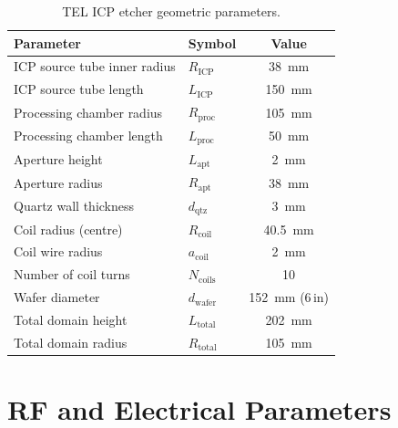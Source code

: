 \documentclass[11pt,a4paper]{report}
\begin{document}
\begin{table}[H]
\centering
\caption{TEL ICP etcher geometric parameters.}
\label{tab:app-geometry}
\begin{tabular}{@{}llc@{}}
\toprule
\textbf{Parameter} & \textbf{Symbol} & \textbf{Value} \\
\midrule
ICP source tube inner radius     & $R_\mathrm{ICP}$    & \SI{38}{\milli\meter} \\
ICP source tube length           & $L_\mathrm{ICP}$    & \SI{150}{\milli\meter} \\
Processing chamber radius        & $R_\mathrm{proc}$   & \SI{105}{\milli\meter} \\
Processing chamber length        & $L_\mathrm{proc}$   & \SI{50}{\milli\meter} \\
Aperture height                  & $L_\mathrm{apt}$    & \SI{2}{\milli\meter} \\
Aperture radius                  & $R_\mathrm{apt}$    & \SI{38}{\milli\meter} \\
Quartz wall thickness            & $d_\mathrm{qtz}$    & \SI{3}{\milli\meter} \\
Coil radius (centre)             & $R_\mathrm{coil}$   & \SI{40.5}{\milli\meter} \\
Coil wire radius                 & $a_\mathrm{coil}$   & \SI{2}{\milli\meter} \\
Number of coil turns             & $N_\mathrm{coils}$  & 10 \\
Wafer diameter                   & $d_\mathrm{wafer}$  & \SI{152}{\milli\meter} (6\,in) \\
Total domain height              & $L_\mathrm{total}$  & \SI{202}{\milli\meter} \\
Total domain radius              & $R_\mathrm{total}$  & \SI{105}{\milli\meter} \\
\bottomrule
\end{tabular}
\end{table}


\section{RF and Electrical Parameters}
\label{app:rf}
\end{document}

